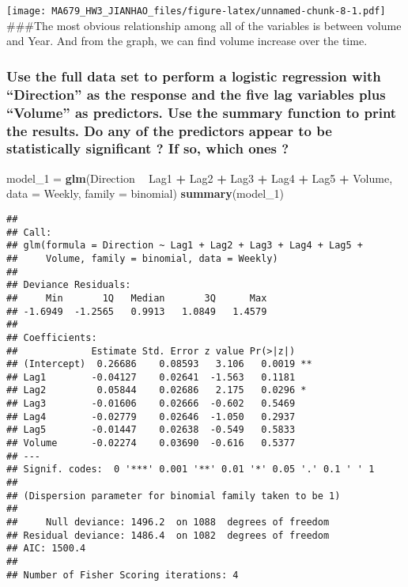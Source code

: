 \documentclass[]{article}
\newenvironment{Shaded}{\begin{snugshade}}{\end{snugshade}}
\newcommand{\KeywordTok}[1]{\textcolor[rgb]{0.13,0.29,0.53}{\textbf{#1}}}
\newcommand{\DataTypeTok}[1]{\textcolor[rgb]{0.13,0.29,0.53}{#1}}
\newcommand{\DecValTok}[1]{\textcolor[rgb]{0.00,0.00,0.81}{#1}}
\newcommand{\StringTok}[1]{\textcolor[rgb]{0.31,0.60,0.02}{#1}}
\newcommand{\OperatorTok}[1]{\textcolor[rgb]{0.81,0.36,0.00}{\textbf{#1}}}
\newcommand{\NormalTok}[1]{#1}
\begin{document}
\texttt{[image: MA679\_HW3\_JIANHAO\_files/figure-latex/unnamed-chunk-8-1.pdf]}
\#\#\#The most obvious relationship among all of the variables is
between volume and Year. And from the graph, we can find volume increase
over the time.

\subsubsection{\texorpdfstring{Use the full data set to perform a
logistic regression with ``Direction'' as the response and the five lag
variables plus ``Volume'' as predictors. Use the summary function to
print the results. Do any of the predictors appear to be statistically
significant ? If so, which ones
?}{Use the full data set to perform a logistic regression with Direction as the response and the five lag variables plus Volume as predictors. Use the summary function to print the results. Do any of the predictors appear to be statistically significant ? If so, which ones ?}}\label{use-the-full-data-set-to-perform-a-logistic-regression-with-direction-as-the-response-and-the-five-lag-variables-plus-volume-as-predictors.-use-the-summary-function-to-print-the-results.-do-any-of-the-predictors-appear-to-be-statistically-significant-if-so-which-ones}

\begin{Shaded}
\begin{Highlighting}[]
\NormalTok{model_}\DecValTok{1}\NormalTok{ =}\StringTok{ }\KeywordTok{glm}\NormalTok{(Direction }\OperatorTok{~}\StringTok{ }\NormalTok{Lag1 }\OperatorTok{+}\StringTok{ }\NormalTok{Lag2 }\OperatorTok{+}\StringTok{ }\NormalTok{Lag3 }\OperatorTok{+}\StringTok{ }\NormalTok{Lag4 }\OperatorTok{+}\StringTok{ }\NormalTok{Lag5 }\OperatorTok{+}\StringTok{ }\NormalTok{Volume, }\DataTypeTok{data =}\NormalTok{ Weekly, }\DataTypeTok{family =}\NormalTok{ binomial)}
\KeywordTok{summary}\NormalTok{(model_}\DecValTok{1}\NormalTok{)}
\end{Highlighting}
\end{Shaded}

\begin{verbatim}
## 
## Call:
## glm(formula = Direction ~ Lag1 + Lag2 + Lag3 + Lag4 + Lag5 + 
##     Volume, family = binomial, data = Weekly)
## 
## Deviance Residuals: 
##     Min       1Q   Median       3Q      Max  
## -1.6949  -1.2565   0.9913   1.0849   1.4579  
## 
## Coefficients:
##             Estimate Std. Error z value Pr(>|z|)   
## (Intercept)  0.26686    0.08593   3.106   0.0019 **
## Lag1        -0.04127    0.02641  -1.563   0.1181   
## Lag2         0.05844    0.02686   2.175   0.0296 * 
## Lag3        -0.01606    0.02666  -0.602   0.5469   
## Lag4        -0.02779    0.02646  -1.050   0.2937   
## Lag5        -0.01447    0.02638  -0.549   0.5833   
## Volume      -0.02274    0.03690  -0.616   0.5377   
## ---
## Signif. codes:  0 '***' 0.001 '**' 0.01 '*' 0.05 '.' 0.1 ' ' 1
## 
## (Dispersion parameter for binomial family taken to be 1)
## 
##     Null deviance: 1496.2  on 1088  degrees of freedom
## Residual deviance: 1486.4  on 1082  degrees of freedom
## AIC: 1500.4
## 
## Number of Fisher Scoring iterations: 4
\end{verbatim}
\end{document}
